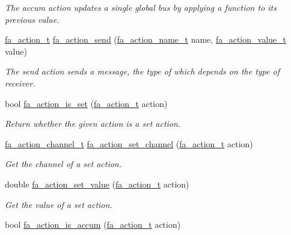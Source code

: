 \begin{DoxyCompactItemize}
\begin{DoxyCompactList}\small\item\em The {\ttfamily accum} action updates a single global bus by applying a function to its previous value. \end{DoxyCompactList}\item 
\hyperlink{group___fa_action_gadb08ae063168671e5fedc6c23f20ae4b}{fa\-\_\-action\-\_\-t} \hyperlink{group___fa_action_ga9f880ad4c24c7b3b897e5787ccaf0798}{fa\-\_\-action\-\_\-send} (\hyperlink{group___fa_action_ga44e517a8d2281a0556ac109c2b639d4b}{fa\-\_\-action\-\_\-name\-\_\-t} name, \hyperlink{group___fa_action_gaac4d474d26b235df5826124cb43464ce}{fa\-\_\-action\-\_\-value\-\_\-t} value)
\begin{DoxyCompactList}\small\item\em The {\ttfamily send} action sends a message, the type of which depends on the type of receiver. \end{DoxyCompactList}\item 
bool \hyperlink{group___fa_action_gafa9061ff63aaadf5078eccd7b534c139}{fa\-\_\-action\-\_\-is\-\_\-set} (\hyperlink{group___fa_action_gadb08ae063168671e5fedc6c23f20ae4b}{fa\-\_\-action\-\_\-t} action)
\begin{DoxyCompactList}\small\item\em Return whether the given action is a set action. \end{DoxyCompactList}\item 
\hyperlink{group___fa_action_ga042610e7e8a7615937f5eeb3a8d789c5}{fa\-\_\-action\-\_\-channel\-\_\-t} \hyperlink{group___fa_action_ga720fb58dfba134736c94d44aa441b59e}{fa\-\_\-action\-\_\-set\-\_\-channel} (\hyperlink{group___fa_action_gadb08ae063168671e5fedc6c23f20ae4b}{fa\-\_\-action\-\_\-t} action)
\begin{DoxyCompactList}\small\item\em Get the channel of a set action. \end{DoxyCompactList}\item 
double \hyperlink{group___fa_action_ga428cbdc66641d4404957b34b2b6789b0}{fa\-\_\-action\-\_\-set\-\_\-value} (\hyperlink{group___fa_action_gadb08ae063168671e5fedc6c23f20ae4b}{fa\-\_\-action\-\_\-t} action)
\begin{DoxyCompactList}\small\item\em Get the value of a set action. \end{DoxyCompactList}\item 
bool \hyperlink{group___fa_action_ga15e38e47b12339f92906e2c16ed65c2f}{fa\-\_\-action\-\_\-is\-\_\-accum} (\hyperlink{group___fa_action_gadb08ae063168671e5fedc6c23f20ae4b}{fa\-\_\-action\-\_\-t} action)

\end{DoxyCompactItemize}
